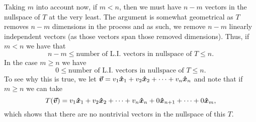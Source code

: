 \documentclass[12pt]{article} %
\begin{document}
\begin{solution}
\begin{enumerate}[(a)]
    Taking $m$ into account now, if $m<n$, then we must have $n-m$ vectors in the nullspace of $T$ at the very least. The argument is somewhat geometrical as $T$ removes $n-m$ dimensions in the process and as such, we remove $n-m$ linearly independent vectors (as those vectors span those removed dimensions).  Thus, if $m<n$ we have that
    \[
        n-m \leq \textrm{number of L.I. vectors in nullspace of $T$} \leq n.
    \]
    In the case $m\geq n$ we have
    \[
       0 \leq \textrm{number of L.I. vectors in nullspace of $T$} \leq n.
    \]
    To see why this is true, we let $\boldsymbol{\vec{v}} = v_1 \boldsymbol{\hat{x}}_1 + v_2 \boldsymbol{\hat{x}}_2 + \cdots + v_n \boldsymbol{\hat{x}} _n$ and note that if $m\geq n$ we can take 
    \[
    T(\boldsymbol{\vec{v}}) = v_1 \boldsymbol{\hat{x}}_1 + v_2 \boldsymbol{\hat{x}}_2 + \cdots + v_n \boldsymbol{\hat{x}}_n + 0 \boldsymbol{\hat{x}}_{n+1} +\cdots + 0 \boldsymbol{\hat{x}}_{m},
    \]
    which shows that there are no nontrivial vectors in the nullspace of this $T$.  
    
\end{enumerate} 

\end{solution}
\end{document}
